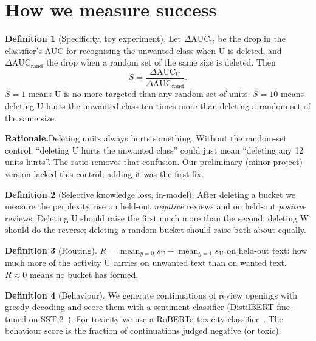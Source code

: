 \documentclass[11pt,a4paper]{article}
\theoremstyle{definition}
\newtheorem{definition}{Definition}
\newcommand{\Wb}{\mathrm{W}}
\newcommand{\Ub}{\mathrm{U}}
\newcommand{\avg}{\operatorname{mean}}
\newcommand{\why}[1]{\par\smallskip\noindent\textbf{Rationale.}\enspace #1\par}
\begin{document}
\section{How we measure success}
\label{sec:metrics}

\begin{definition}[Specificity, toy experiment]
Let $\Delta\mathrm{AUC}_{\Ub}$ be the drop in the classifier's AUC for recognising the unwanted
class when $\Ub$ is deleted, and $\Delta\mathrm{AUC}_{\mathrm{rand}}$ the drop when a random set of
the same size is deleted. Then
\begin{equation}
  S=\frac{\Delta\mathrm{AUC}_{\Ub}}{\Delta\mathrm{AUC}_{\mathrm{rand}}} .
\end{equation}
$S=1$ means $\Ub$ is no more targeted than any random set of units. $S=10$ means deleting $\Ub$
hurts the unwanted class ten times more than deleting a random set of the same size.
\end{definition}

\why{Deleting units always hurts something. Without the random-set control, ``deleting $\Ub$ hurts
the unwanted class'' could just mean ``deleting any 12 units hurts''. The ratio removes that
confusion. Our preliminary (minor-project) version lacked this control; adding it was the first fix.}

\begin{definition}[Selective knowledge loss, in-model]
After deleting a bucket we measure the perplexity rise on held-out \emph{negative} reviews and on
held-out \emph{positive} reviews. Deleting $\Ub$ should raise the first much more than the second;
deleting $\Wb$ should do the reverse; deleting a random bucket should raise both about equally.
\end{definition}

\begin{definition}[Routing]
$R=\avg_{y=0}s_{\Ub}-\avg_{y=1}s_{\Ub}$ on held-out text: how much more of the activity $\Ub$
carries on unwanted text than on wanted text. $R\approx0$ means no bucket has formed.
\end{definition}

\begin{definition}[Behaviour]
We generate continuations of review openings with greedy decoding and score them with a sentiment
classifier (DistilBERT fine-tuned on SST-2~\cite{sanh2019distilbert,socher2013sst}). For toxicity
we use a RoBERTa toxicity classifier~\cite{logacheva2022paradetox}. The behaviour score is the
fraction of continuations judged negative (or toxic).
\end{definition}
\end{document}
